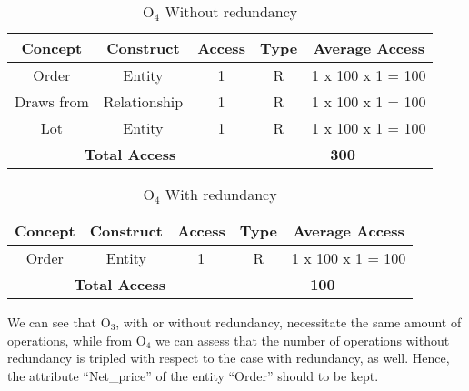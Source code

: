 \begin{table}[!h]\caption{	$ \textrm{O}_\textrm{4} $ Without redundancy }
	\begin{center}
		\begin{tabular}{| c | c | c | c | c |}
			\hline
			\textbf{Concept} & \textbf{Construct} & \textbf{Access} & \textbf{Type} & \textbf{Average Access} \\ \hline
			Order & Entity & 1 & R & 1 x 100 x 1 = 100 \\ \hline
			Draws from & Relationship & 1 & R & 1 x 100 x 1 = 100 \\ \hline
			Lot & Entity & 1 & R & 1 x 100 x 1 = 100 \\ \hline
			\multicolumn{3}{|c|}{\textbf{Total Access}} & \multicolumn{2}{|c|}{\textbf{300}} \\ \hline
		\end{tabular}
	\end{center}
\end{table}
\newpage
\begin{table}[!h]\caption{	$ \textrm{O}_\textrm{4} $ With redundancy }
	\begin{center}
		\begin{tabular}{| c | c | c | c | c |}
			\hline
			\textbf{Concept} & \textbf{Construct} & \textbf{Access} & \textbf{Type} & \textbf{Average Access} \\ \hline
			Order & Entity & 1 & R & 1 x 100 x 1 = 100 \\ \hline
			\multicolumn{3}{|c|}{\textbf{Total Access}} & \multicolumn{2}{|c|}{\textbf{100}} \\ \hline
		\end{tabular}
	\end{center}
\end{table}





\newpage
We can see that $ \textrm{O}_\textrm{3} $, with or without redundancy, necessitate the same amount of operations, while from $ \textrm{O}_\textrm{4} $ we can assess that the number of operations without redundancy is tripled with respect to the case with redundancy, as well. Hence, the attribute ``Net\_price'' of the entity ``Order'' should to be kept.